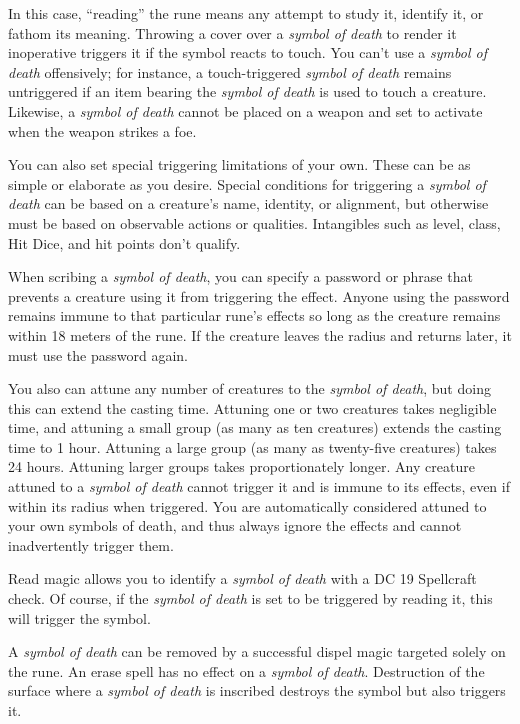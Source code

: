 {	In this case, ``reading'' the rune means any attempt to study it, identify it, or fathom its meaning. Throwing a cover over a \emph{symbol of death} to render it inoperative triggers it if the symbol reacts to touch. You can't use a \emph{symbol of death} offensively; for instance, a touch-triggered \emph{symbol of death} remains untriggered if an item bearing the \emph{symbol of death} is used to touch a creature. Likewise, a \emph{symbol of death} cannot be placed on a weapon and set to activate when the weapon strikes a foe.

	You can also set special triggering limitations of your own. These can be as simple or elaborate as you desire. Special conditions for triggering a \emph{symbol of death} can be based on a creature's name, identity, or alignment, but otherwise must be based on observable actions or qualities. Intangibles such as level, class, Hit Dice, and hit points don't qualify.

	When scribing a \emph{symbol of death}, you can specify a password or phrase that prevents a creature using it from triggering the effect. Anyone using the password remains immune to that particular rune's effects so long as the creature remains within 18 meters of the rune. If the creature leaves the radius and returns later, it must use the password again.

	You also can attune any number of creatures to the \emph{symbol of death}, but doing this can extend the casting time. Attuning one or two creatures takes negligible time, and attuning a small group (as many as ten creatures) extends the casting time to 1 hour. Attuning a large group (as many as twenty-five creatures) takes 24 hours. Attuning larger groups takes proportionately longer. Any creature attuned to a \emph{symbol of death} cannot trigger it and is immune to its effects, even if within its radius when triggered. You are automatically considered attuned to your own symbols of death, and thus always ignore the effects and cannot inadvertently trigger them.

	Read magic allows you to identify a \emph{symbol of death} with a DC 19 Spellcraft check. Of course, if the \emph{symbol of death} is set to be triggered by reading it, this will trigger the symbol.

	A \emph{symbol of death} can be removed by a successful dispel magic targeted solely on the rune. An erase spell has no effect on a \emph{symbol of death}. Destruction of the surface where a \emph{symbol of death} is inscribed destroys the symbol but also triggers it.

}
